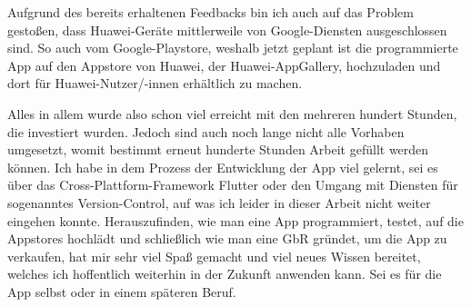 Aufgrund des bereits erhaltenen Feedbacks bin ich auch auf das Problem gestoßen, dass Huawei-Geräte mittlerweile von Google-Diensten ausgeschlossen sind.
So auch vom Google-Playstore, weshalb jetzt geplant ist die programmierte App auf den Appstore von Huawei, der Huawei-AppGallery, hochzuladen und dort
für Huawei-Nutzer/-innen erhältlich zu machen.

Alles in allem wurde also schon viel erreicht mit den mehreren hundert Stunden, die investiert wurden. Jedoch sind auch noch lange nicht alle Vorhaben 
umgesetzt, womit bestimmt erneut hunderte Stunden Arbeit gefüllt werden können. Ich habe in dem Prozess der Entwicklung der App viel gelernt, sei es 
über das Cross-Plattform-Framework Flutter oder den Umgang mit Diensten für sogenanntes Version-Control, auf was ich leider in dieser Arbeit nicht weiter eingehen konnte.
Herauszufinden, wie man eine App programmiert, testet, auf die Appstores hochlädt und schließlich wie man eine GbR gründet, um die App zu verkaufen,
hat mir sehr viel Spaß gemacht und viel neues Wissen bereitet, welches ich hoffentlich weiterhin in der Zukunft anwenden kann. Sei es für die 
App selbst oder in einem späteren Beruf.